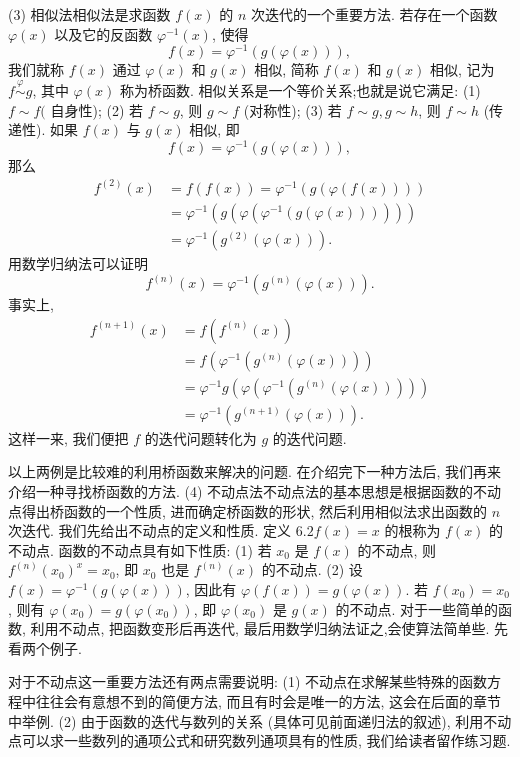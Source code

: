 (3) 相似法相似法是求函数 $f(x)$ 的 $n$ 次迭代的一个重要方法.
若存在一个函数 $\varphi(x)$ 以及它的反函数 $\varphi^{-1}(x)$, 使得
$$
f(x)=\varphi^{-1}(g(\varphi(x))),
$$
我们就称 $f(x)$ 通过 $\varphi(x)$ 和 $g(x)$ 相似, 简称 $f(x)$ 和 $g(x)$ 相似, 记为 $f \stackrel{\varphi}{\sim} g$, 其中 $\varphi(x)$ 称为桥函数.
相似关系是一个等价关系;也就是说它满足:
(1) $f \sim f($ 自身性);
(2) 若 $f \sim g$, 则 $g \sim f$ (对称性);
(3) 若 $f \sim g, g \sim h$, 则 $f \sim h$ (传递性).
如果 $f(x)$ 与 $g(x)$ 相似, 即
$$
f(x)=\varphi^{-1}(g(\varphi(x))),
$$
那么
$$
\begin{aligned}
f^{(2)}(x) & =f(f(x))=\varphi^{-1}(g(\varphi(f(x)))) \\
& =\varphi^{-1}\left(g\left(\varphi\left(\varphi^{-1}(g(\varphi(x)))\right)\right)\right) \\
& =\varphi^{-1}\left(g^{(2)}(\varphi(x))\right) .
\end{aligned}
$$
用数学归纳法可以证明
$$
f^{(n)}(x)=\varphi^{-1}\left(g^{(n)}(\varphi(x))\right) .
$$
事实上,
$$
\begin{aligned}
f^{(n+1)}(x) & =f\left(f^{(n)}(x)\right) \\
& =f\left(\varphi^{-1}\left(g^{(n)}(\varphi(x))\right)\right) \\
& =\varphi^{-1} g\left(\varphi\left(\varphi^{-1}\left(g^{(n)}(\varphi(x))\right)\right)\right) \\
& =\varphi^{-1}\left(g^{(n+1)}(\varphi(x))\right) .
\end{aligned}
$$
这样一来, 我们便把 $f$ 的迭代问题转化为 $g$ 的迭代问题.



以上两例是比较难的利用桥函数来解决的问题.
在介绍完下一种方法后, 我们再来介绍一种寻找桥函数的方法.
(4) 不动点法不动点法的基本思想是根据函数的不动点得出桥函数的一个性质, 进而确定桥函数的形状, 然后利用相似法求出函数的 $n$ 次迭代.
我们先给出不动点的定义和性质.
定义 $6.2 f(x)=x$ 的根称为 $f(x)$ 的不动点.
函数的不动点具有如下性质:
(1) 若 $x_0$ 是 $f(x)$ 的不动点, 则 $f^{(n)}\left(x_0\right)^x=x_0$, 即 $x_0$ 也是 $f^{(n)}(x)$ 的不动点.
(2) 设 $f(x)=\varphi^{-1}(g(\varphi(x)))$, 因此有 $\varphi(f(x))=g(\varphi(x))$. 若 $f\left(x_0\right)= x_0$, 则有 $\varphi\left(x_0\right)=g\left(\varphi\left(x_0\right)\right)$, 即 $\varphi\left(x_0\right)$ 是 $g(x)$ 的不动点.
对于一些简单的函数, 利用不动点, 把函数变形后再迭代, 最后用数学归纳法证之,会使算法简单些.
先看两个例子.



对于不动点这一重要方法还有两点需要说明:
(1) 不动点在求解某些特殊的函数方程中往往会有意想不到的简便方法, 而且有时会是唯一的方法, 这会在后面的章节中举例.
(2) 由于函数的迭代与数列的关系 (具体可见前面递归法的叙述), 利用不动点可以求一些数列的通项公式和研究数列通项具有的性质, 我们给读者留作练习题.



